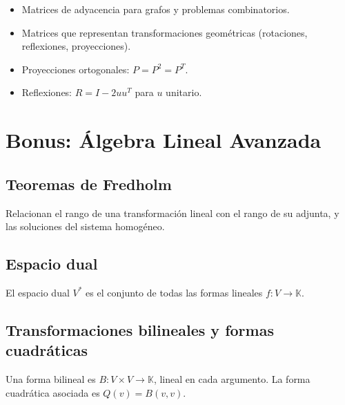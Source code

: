 \documentclass{article}
\begin{document}
\begin{itemize}
    \item Matrices de adyacencia para grafos y problemas combinatorios.
    \item Matrices que representan transformaciones geométricas (rotaciones, reflexiones, proyecciones).
    \item Proyecciones ortogonales: \( P = P^2 = P^T \).
    \item Reflexiones: \( R = I - 2 uu^T \) para \( u \) unitario.
\end{itemize}

\section*{Bonus: Álgebra Lineal Avanzada}

\subsection{Teoremas de Fredholm}
Relacionan el rango de una transformación lineal con el rango de su adjunta, y las soluciones del sistema homogéneo.


\subsection{Espacio dual}
El espacio dual \( V^* \) es el conjunto de todas las formas lineales \( f: V \to \mathbb{K} \).


\subsection{Transformaciones bilineales y formas cuadráticas}
Una forma bilineal es \( B: V \times V \to \mathbb{K} \), lineal en cada argumento. La forma cuadrática asociada es \( Q(v) = B(v,v) \).
\end{document}
